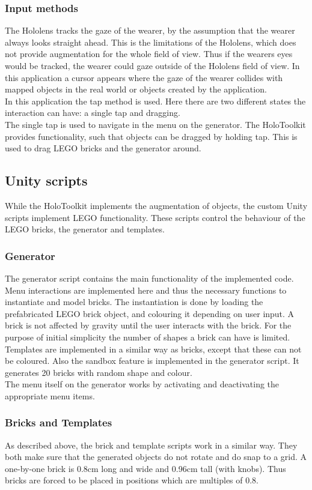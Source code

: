\subsubsection{Input methods}
The Hololens tracks the gaze of the wearer, by the assumption that the wearer always looks straight ahead. This is the limitations of the Hololens, which does not provide augmentation for the whole field of view. Thus if the wearers eyes would be tracked, the wearer could gaze outside of the Hololens field of view. In this application a cursor appears where the gaze of the wearer collides with mapped objects in the real world or objects created by the application.\\ 
In this application the tap method is used. Here there are two different states the interaction can have: a single tap and dragging. \\
The single tap is used to navigate in the menu on the generator. The HoloToolkit provides functionality, such that objects can be dragged by holding tap. This is used to drag LEGO bricks and the generator around.

\subsection{Unity scripts}
While the HoloToolkit implements the augmentation of objects, the custom Unity scripts implement LEGO functionality. These scripts control the behaviour of the LEGO bricks, the generator and templates. 

\subsubsection{Generator}
The generator script contains the main functionality of the implemented code. Menu interactions are implemented here and thus the necessary functions to instantiate and model bricks. The instantiation is done by loading the prefabricated LEGO brick object, and colouring it depending on user input. A brick is not affected by gravity until the user interacts with the brick. For the purpose of initial simplicity the number of shapes a brick can have is limited. \\
Templates are implemented in a similar way as bricks, except that these can not be coloured. Also the sandbox feature is implemented in the generator script. It generates 20 bricks with random shape and colour. \\
The menu itself on the generator works by activating and deactivating the appropriate menu items.

\subsubsection{Bricks and Templates}
As described above, the brick and template scripts work in a similar way. They both make sure that the generated objects do not rotate and do snap to a grid. A one-by-one brick is 0.8cm long and wide and 0.96cm tall (with knobs). Thus bricks are forced to be placed in positions which are multiples of 0.8.